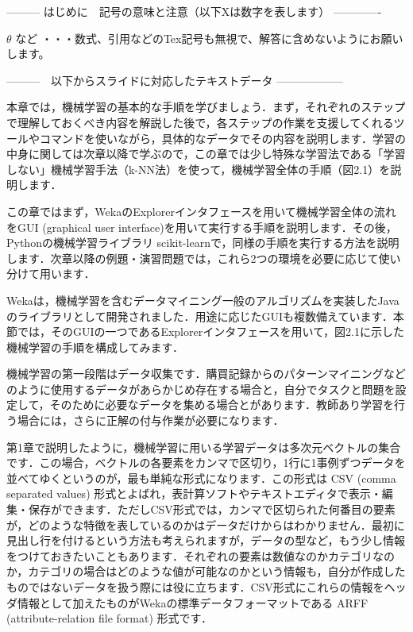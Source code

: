 --------- はじめに　記号の意味と注意（以下Xは数字を表します） -------------

$\theta$ など       ・・・数式、引用などのTex記号も無視で、解答に含めないようにお願いします。
\cite{mitchell97}

---------　以下からスライドに対応したテキストデータ ------------------



本章では，機械学習の基本的な手順を学びましょう．まず，それぞれのステップで理解しておくべき内容を解説した後で，各ステップの作業を支援してくれるツールやコマンドを使いながら，具体的なデータでその内容を説明します．学習の中身に関しては次章以降で学ぶので，この章では少し特殊な学習法である「学習しない」機械学習手法（k-NN法）を使って，機械学習全体の手順（図2.1）を説明します．


この章ではまず，WekaのExplorerインタフェースを用いて機械学習全体の流れをGUI (graphical user interface)を用いて実行する手順を説明します．その後，Pythonの機械学習ライブラリ scikit-learnで，同様の手順を実行する方法を説明します．次章以降の例題・演習問題では，これら2つの環境を必要に応じて使い分けて用います．


Wekaは，機械学習を含むデータマイニング一般のアルゴリズムを実装したJavaのライブラリとして開発されました．用途に応じたGUIも複数備えています．本節では，そのGUIの一つであるExplorerインタフェースを用いて，図2.1に示した機械学習の手順を構成してみます．


機械学習の第一段階はデータ収集です．購買記録からのパターンマイニングなどのように使用するデータがあらかじめ存在する場合と，自分でタスクと問題を設定して，そのために必要なデータを集める場合とがあります．教師あり学習を行う場合には，さらに正解の付与作業が必要になります．

第1章で説明したように，機械学習に用いる学習データは多次元ベクトルの集合です．この場合，ベクトルの各要素をカンマで区切り，1行に1事例ずつデータを並べてゆくというのが，最も単純な形式になります．この形式は CSV (comma separated values) 形式とよばれ，表計算ソフトやテキストエディタで表示・編集・保存ができます．ただしCSV形式では，カンマで区切られた何番目の要素が，どのような特徴を表しているのかはデータだけからはわかりません．最初に見出し行を付けるという方法も考えられますが，データの型など，もう少し情報をつけておきたいこともあります．それぞれの要素は数値なのかカテゴリなのか，カテゴリの場合はどのような値が可能なのかという情報も，自分が作成したものではないデータを扱う際には役に立ちます．CSV形式にこれらの情報をヘッダ情報として加えたものがWekaの標準データフォーマットである
ARFF (attribute-relation file format) 
形式です．

